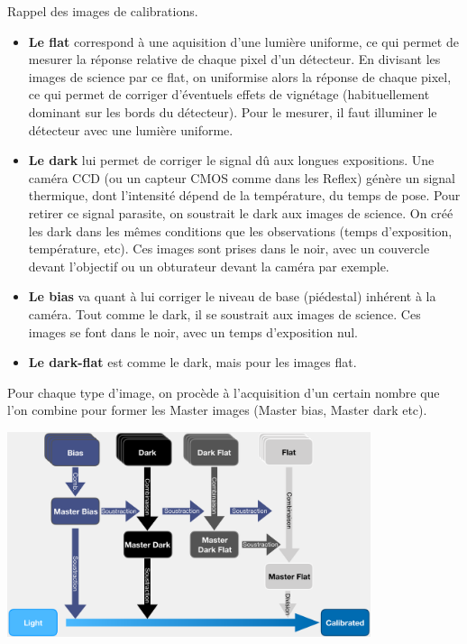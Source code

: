 \documentclass[../main/main.tex]{subfiles}
\begin{document}
    \begin{frshaded*}
    \footnotesize
      \centerline{Rappel des images de calibrations.}
      \begin{itemize}
      \item \textbf{Le flat} correspond à une
        aquisition d'une lumière uniforme, ce qui permet de mesurer la réponse
        relative de chaque
        pixel d'un détecteur. En divisant les images de science par ce flat,
        on uniformise alors la réponse de chaque pixel, ce qui permet de
        corriger d'éventuels effets de vignétage (habituellement dominant sur
        les bords du détecteur). Pour le mesurer, il faut illuminer le
        détecteur avec une lumière uniforme. 
        
      \item \textbf{Le dark} lui permet de corriger le signal dû aux longues
        expositions. Une caméra CCD (ou un capteur CMOS comme dans les
        Reflex) génère un signal thermique, dont l'intensité dépend de la
        température, du temps de pose. Pour retirer ce signal parasite, on soustrait le dark aux images de
        science. On créé les dark dans les mêmes conditions que les
        observations (temps d'exposition, température, etc). Ces images sont
        prises dans le noir, avec un couvercle devant
        l'objectif ou un obturateur devant la caméra par exemple.
        
      \item \textbf{Le bias} va quant à lui corriger le niveau de base (piédestal) inhérent à la
        caméra. Tout comme le dark, il se soustrait
        aux images de science. Ces images se font
        dans le noir, avec un temps d'exposition nul.

      \item \textbf{Le dark-flat} est comme le dark, mais pour les
        images flat.
    \end{itemize}
    Pour chaque type d'image, on procède à l'acquisition d'un certain
    nombre que l'on combine pour former les Master images (Master bias,
    Master dark etc).
    \begin{center}
      \includegraphics[width=0.8\textwidth]{../figures/03_sedm/calibdag.png}
      \captionsetup{font=footnotesize}
    \end{center}
  \end{frshaded*}
\end{document}
